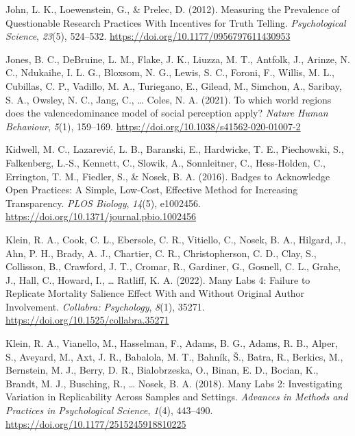 \documentclass[
  man]{apa7}
\newlength{\cslhangindent}
\newlength{\cslentryspacingunit} %
\newenvironment{CSLReferences}[2] %
 {%
  \setlength{\parindent}{0pt}
  \ifodd #1
  \let\oldpar\par
  \def\par{\hangindent=\cslhangindent\oldpar}
  \fi
  \setlength{\parskip}{#2\cslentryspacingunit}
 }%
 {}
\begin{document}
\begin{CSLReferences}{1}{0}
\leavevmode{}%
John, L. K., Loewenstein, G., \& Prelec, D. (2012). Measuring the Prevalence of Questionable Research Practices With Incentives for Truth Telling. \emph{Psychological Science}, \emph{23}(5), 524--532. \url{https://doi.org/10.1177/0956797611430953}

\leavevmode{}%
Jones, B. C., DeBruine, L. M., Flake, J. K., Liuzza, M. T., Antfolk, J., Arinze, N. C., Ndukaihe, I. L. G., Bloxsom, N. G., Lewis, S. C., Foroni, F., Willis, M. L., Cubillas, C. P., Vadillo, M. A., Turiegano, E., Gilead, M., Simchon, A., Saribay, S. A., Owsley, N. C., Jang, C., \ldots{} Coles, N. A. (2021). To which world regions does the valence{\textendash}dominance model of social perception apply? \emph{Nature Human Behaviour}, \emph{5}(1), 159--169. \url{https://doi.org/10.1038/s41562-020-01007-2}

\leavevmode{}%
Kidwell, M. C., Lazarević, L. B., Baranski, E., Hardwicke, T. E., Piechowski, S., Falkenberg, L.-S., Kennett, C., Slowik, A., Sonnleitner, C., Hess-Holden, C., Errington, T. M., Fiedler, S., \& Nosek, B. A. (2016). Badges to Acknowledge Open Practices: A Simple, Low-Cost, Effective Method for Increasing Transparency. \emph{PLOS Biology}, \emph{14}(5), e1002456. \url{https://doi.org/10.1371/journal.pbio.1002456}

\leavevmode{}%
Klein, R. A., Cook, C. L., Ebersole, C. R., Vitiello, C., Nosek, B. A., Hilgard, J., Ahn, P. H., Brady, A. J., Chartier, C. R., Christopherson, C. D., Clay, S., Collisson, B., Crawford, J. T., Cromar, R., Gardiner, G., Gosnell, C. L., Grahe, J., Hall, C., Howard, I., \ldots{} Ratliff, K. A. (2022). Many Labs 4: Failure to Replicate Mortality Salience Effect With and Without Original Author Involvement. \emph{Collabra: Psychology}, \emph{8}(1), 35271. \url{https://doi.org/10.1525/collabra.35271}

\leavevmode{}%
Klein, R. A., Vianello, M., Hasselman, F., Adams, B. G., Adams, R. B., Alper, S., Aveyard, M., Axt, J. R., Babalola, M. T., Bahník, Š., Batra, R., Berkics, M., Bernstein, M. J., Berry, D. R., Bialobrzeska, O., Binan, E. D., Bocian, K., Brandt, M. J., Busching, R., \ldots{} Nosek, B. A. (2018). Many Labs 2: Investigating Variation in Replicability Across Samples and Settings. \emph{Advances in Methods and Practices in Psychological Science}, \emph{1}(4), 443--490. \url{https://doi.org/10.1177/2515245918810225}


\end{CSLReferences}
\end{document}
